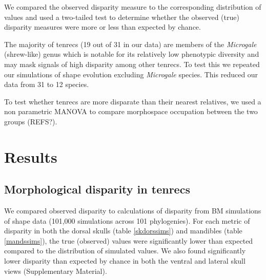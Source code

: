 \documentclass[12pt,a4paper]{article}
\begin{document}

We compared the observed disparity measure to the corresponding distribution of values and used a two-tailed test to determine whether the observed (true) disparity measures were more or less than expected by chance.

The majority of tenrecs (19 out of 31 in our data) are members of the \textit{Microgale} (shrew-like) genus which is notable for its relatively low phenotypic diversity \citep{ Soarimalala2011, Jenkins2003} and may mask signals of high disparity among other tenrecs. To test this we repeated our simulations of shape evolution excluding \textit{Microgale} species. This reduced our data from 31 to 12 species. 

To test whether tenrecs are more disparate than their nearest relatives, we used a non parametric MANOVA \citep{Anderson2001} to compare morphospace occupation between the two groups (REFS?). 



\section{Results}

\subsection{Morphological disparity in tenrecs} 
	

We compared observed disparity to calculations of disparity from BM simulations of shape data (101,000 simulations across 101 phylogenies). For each metric of disparity in both the dorsal skulls (table \ref{skdorssims}) and mandibles (table \ref{mandssims}), the true (observed) values were significantly lower than expected compared to the distribution of simulated values. We also found significantly lower disparity than expected by chance in both the ventral and lateral skull views (Supplementary Material).
\end{document}
